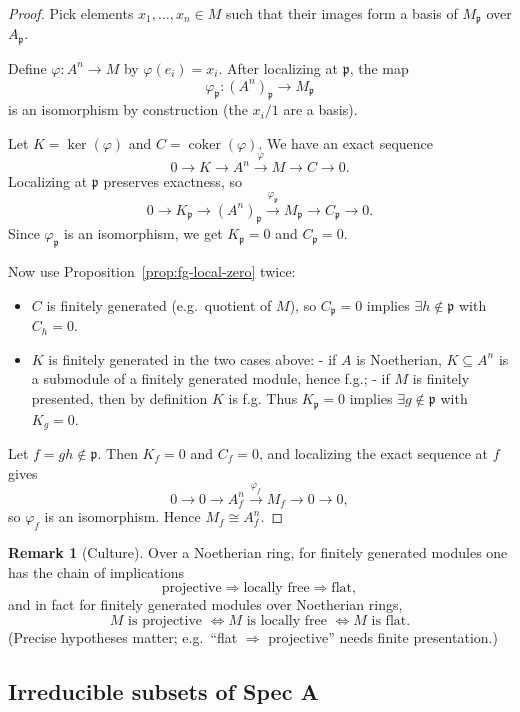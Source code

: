 \documentclass[11pt,a4paper]{article}
\theoremstyle{definition}
\newtheorem{remark}[definition]{Remark}
\theoremstyle{plain}
\theoremstyle{remark}
\newcommand{\coker}{\operatorname{coker}}
\begin{document}
\begin{proof}
Pick elements $x_1,\dots,x_n\in M$ such that their images form a basis of $M_{\mathfrak p}$
over $A_{\mathfrak p}$.

Define $\varphi:A^n\to M$ by $\varphi(e_i)=x_i$.
After localizing at $\mathfrak p$, the map
\[
\varphi_{\mathfrak p}:(A^n)_{\mathfrak p}\to M_{\mathfrak p}
\]
is an isomorphism by construction (the $x_i/1$ are a basis).

Let $K=\ker(\varphi)$ and $C=\coker(\varphi)$. We have an exact sequence
\[
0\to K\to A^n\xrightarrow{\varphi} M\to C\to 0.
\]
Localizing at $\mathfrak p$ preserves exactness, so
\[
0\to K_{\mathfrak p}\to (A^n)_{\mathfrak p}\xrightarrow{\varphi_{\mathfrak p}} M_{\mathfrak p}\to C_{\mathfrak p}\to 0.
\]
Since $\varphi_{\mathfrak p}$ is an isomorphism, we get $K_{\mathfrak p}=0$ and $C_{\mathfrak p}=0$.

Now use Proposition~\ref{prop:fg-local-zero} twice:
\begin{itemize}
\item $C$ is finitely generated (e.g.\ quotient of $M$), so $C_{\mathfrak p}=0$ implies
$\exists h\notin\mathfrak p$ with $C_h=0$.
\item $K$ is finitely generated in the two cases above:
  - if $A$ is Noetherian, $K\subseteq A^n$ is a submodule of a finitely generated module, hence f.g.;
  - if $M$ is finitely presented, then by definition $K$ is f.g.
Thus $K_{\mathfrak p}=0$ implies $\exists g\notin\mathfrak p$ with $K_g=0$.
\end{itemize}
Let $f=gh\notin\mathfrak p$. Then $K_f=0$ and $C_f=0$, and localizing the exact sequence at $f$
gives
\[
0\to 0 \to A_f^n\xrightarrow{\varphi_f} M_f\to 0\to 0,
\]
so $\varphi_f$ is an isomorphism. Hence $M_f\cong A_f^n$.
\end{proof}

\begin{remark}[Culture]
Over a Noetherian ring, for finitely generated modules one has the chain of implications
\[
\text{projective} \Longrightarrow \text{locally free} \Longrightarrow \text{flat},
\]
and in fact for finitely generated modules over Noetherian rings,
\[
M \text{ is projective } \iff M \text{ is locally free } \iff M \text{ is flat}.
\]
(Precise hypotheses matter; e.g.\ “flat $\Rightarrow$ projective” needs finite presentation.)
\end{remark}


\subsection{Irreducible subsets of Spec A}
\end{document}

